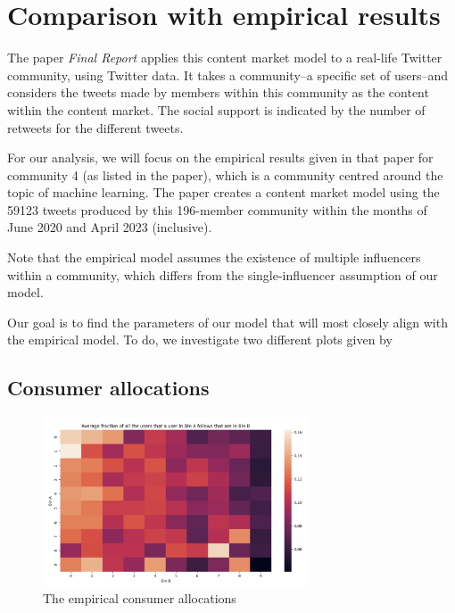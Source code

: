 \documentclass[11pt, letterpaper]{article}
\begin{document}
\pagebreak

\section{Comparison with empirical results}

The paper \textit{Final Report} applies this content market model to a real-life Twitter community, using Twitter data. It takes a community--a specific set of users--and considers the tweets made by members within this community as the content within the content market. The social support is indicated by the number of retweets for the different tweets.

For our analysis, we will focus on the empirical results given in that paper for community 4 (as listed in the paper), which is a community centred around the topic of machine learning. The paper creates a content market model using the 59123 tweets produced by this 196-member community within the months of June 2020 and April 2023 (inclusive). 

Note that the empirical model assumes the existence of multiple influencers within a community, which differs from the single-influencer assumption of our model.

Our goal is to find the parameters of our model that will most closely align with the empirical model. To do, we investigate two different plots given by

\subsection{Consumer allocations}

\begin{figure}[h]
    \centering
    \includegraphics[width=0.7\textwidth]{figures/rachel_heatmap.png}
    \caption{The empirical consumer allocations}
    \label{fig:rachel_heatmap}
\end{figure}
\end{document}
